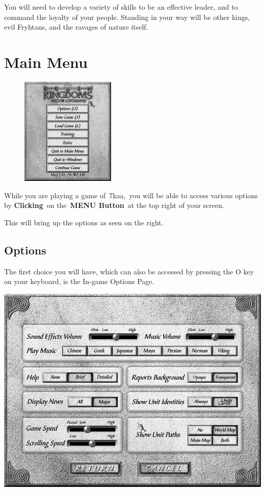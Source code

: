 You will need to develop a variety of skills to be an effective leader, and to command the loyalty of your people. Standing in your way will be other kings, evil Fryhtans, and the ravages of nature itself.

\section{Main Menu}

\begin{figure}
	\begin{center}
		\vspace{-20pt}
		\includegraphics[width=0.4\textwidth]{Imainmenu}
	\end{center}
	\vspace{-20pt}
\end{figure}

While you are playing a game of 7kaa, you will be able to access various options by \textbf{Clicking} on the \textbf{MENU Button} at the top right of your screen.

This will bring up the options as seen on the right.

\clearpage %

\subsection{Options}

The first choice you will have, which can also be accessed by pressing the O key on your keyboard, is the In-game Options Page.

\begin{center}
	\includegraphics[width=0.7\linewidth]{Ioptions}
\end{center}

